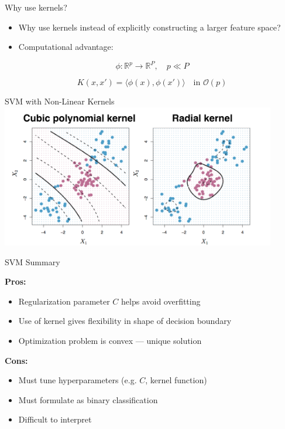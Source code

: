 \begin{frame}{Why use kernels?}
    \begin{itemize}
        \item  Why use kernels instead of explicitly constructing a larger feature space?
    \item Computational advantage:
    \end{itemize}
    \[
    \phi : \mathbb{R}^p \rightarrow \mathbb{R}^P, \quad p \ll P
    \]

    \[
    K(x, x') = \langle \phi(x), \phi(x') \rangle \quad \text{in } \mathcal{O}(p)
    \]
\end{frame}

\begin{frame}{SVM with Non-Linear Kernels}
    \centering
    \includegraphics[width=0.9\textwidth]{images/support-vector-machines/support-vector-machines-22.png}
\end{frame}


\begin{frame}{SVM Summary}

\textbf{Pros:}
\begin{itemize}
    \item Regularization parameter $C$ helps avoid overfitting
    \item Use of kernel gives flexibility in shape of decision boundary
    \item Optimization problem is convex — unique solution
\end{itemize}

\textbf{Cons:}
\begin{itemize}
    \item Must tune hyperparameters (e.g. $C$, kernel function)
    \item Must formulate as binary classification
    \item Difficult to interpret
\end{itemize}

\end{frame}


